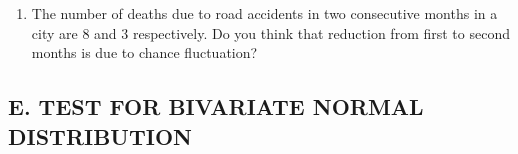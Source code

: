 \documentclass[11pt, a4paper]{article}
\begin{document}
\begin{enumerate}

\item The number of deaths due to road accidents in two consecutive months in a city are 8 and 3 respectively. 
Do you think that reduction from first to second months is due to chance fluctuation? 

\end{enumerate}

































\pagebreak

\begin{center}

\section*{E. TEST FOR BIVARIATE NORMAL DISTRIBUTION}

\end{center}
\end{document}
